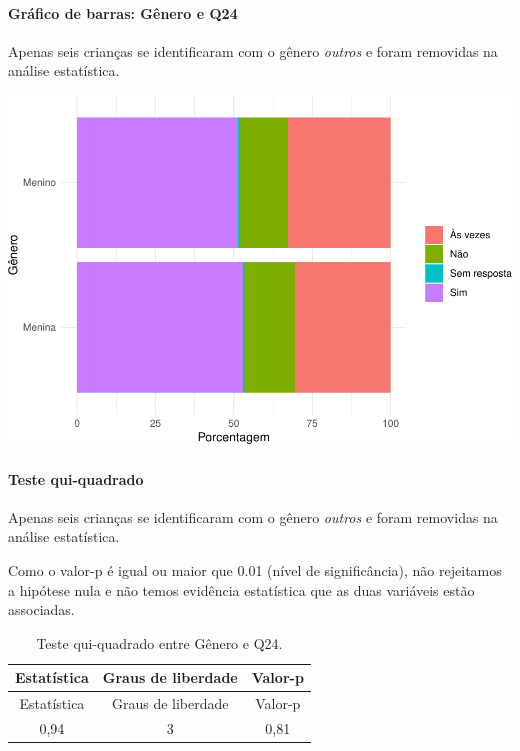 \documentclass[]{article}
\let\oldparagraph\paragraph
\renewcommand{\paragraph}[1]{\oldparagraph{#1}\mbox{}}
\begin{document}
\hypertarget{gruxe1fico-de-barras-guxeanero-e-q24}{%
\paragraph{Gráfico de barras: Gênero e Q24}\label{gruxe1fico-de-barras-guxeanero-e-q24}}

Apenas seis crianças se identificaram com o gênero \emph{outros} e foram removidas na análise estatística.

\begin{center}\includegraphics[width=0.75\linewidth]{relatorio_covid19_files/figure-latex/unnamed-chunk-614-1} \end{center}

\hypertarget{teste-qui-quadrado-53}{%
\paragraph{Teste qui-quadrado}\label{teste-qui-quadrado-53}}

Apenas seis crianças se identificaram com o gênero \emph{outros} e foram removidas na análise estatística.

Como o valor-p é igual ou maior que 0.01 (nível de significância), não rejeitamos a hipótese nula e não temos evidência estatística que as duas variáveis estão associadas.

\begin{longtable}[]{@{}ccc@{}}
\caption{\label{tab:unnamed-chunk-616}Teste qui-quadrado entre Gênero e Q24.}\tabularnewline
\toprule
Estatística & Graus de liberdade & Valor-p\tabularnewline
\midrule
\endfirsthead
\toprule
Estatística & Graus de liberdade & Valor-p\tabularnewline
\midrule
\endhead
0,94 & 3 & 0,81\tabularnewline
\bottomrule
\end{longtable}

\cleardoublepage
\end{document}
